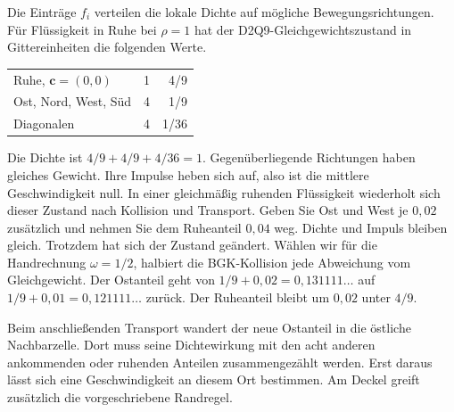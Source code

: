 Die Einträge \(f_i\) verteilen die lokale Dichte auf mögliche Bewegungsrichtungen. Für Flüssigkeit in Ruhe bei \(\rho=1\) hat der D2Q9-Gleichgewichtszustand in Gittereinheiten die folgenden Werte.
{\tblstart\begin{tabularx}{\linewidth}{@{}Yrr@{}}\toprule
{}&&\\\midrule
Ruhe, \(\mathbf c=(0,0)\)&1&4/9\\
Ost, Nord, West, Süd&4&1/9\\
Diagonalen&4&1/36\\\bottomrule
\end{tabularx}\par}
Die Dichte ist \(4/9+4/9+4/36=1\). Gegenüberliegende Richtungen haben gleiches Gewicht. Ihre Impulse heben sich auf, also ist die mittlere Geschwindigkeit null. In einer gleichmäßig ruhenden Flüssigkeit wiederholt sich dieser Zustand nach Kollision und Transport.
Geben Sie Ost und West je \(0{,}02\) zusätzlich und nehmen Sie dem Ruheanteil \(0{,}04\) weg. Dichte und Impuls bleiben gleich. Trotzdem hat sich der Zustand geändert. Wählen wir für die Handrechnung \(\omega=1/2\), halbiert die BGK-Kollision jede Abweichung vom Gleichgewicht. Der Ostanteil geht von \(1/9+0{,}02=0{,}131111\ldots\) auf \(1/9+0{,}01=0{,}121111\ldots\) zurück. Der Ruheanteil bleibt um \(0{,}02\) unter \(4/9\).

Beim anschließenden Transport wandert der neue Ostanteil in die östliche Nachbarzelle. Dort muss seine Dichtewirkung mit den acht anderen ankommenden oder ruhenden Anteilen zusammengezählt werden. Erst daraus lässt sich eine Geschwindigkeit an diesem Ort bestimmen. Am Deckel greift zusätzlich die vorgeschriebene Randregel.

